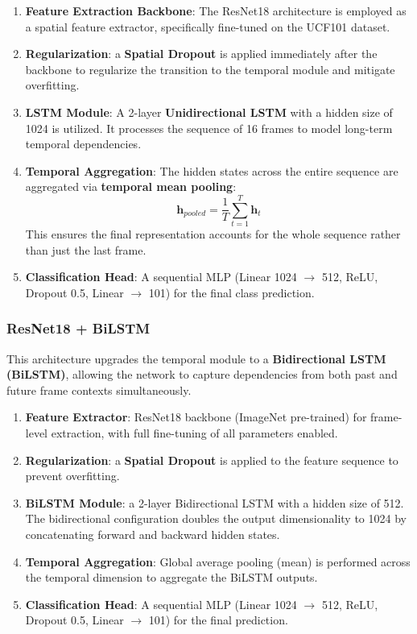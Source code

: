 \begin{enumerate} 
    \item \textbf{Feature Extraction Backbone}: The ResNet18 architecture is employed as a spatial feature extractor, specifically fine-tuned on the UCF101 dataset.
    \item \textbf{Regularization}: a \textbf{Spatial Dropout} is applied immediately after the backbone to regularize the transition to the temporal module and mitigate overfitting.
    \item \textbf{LSTM Module}: A 2-layer \textbf{Unidirectional LSTM} with a hidden size of 1024 is utilized. It processes the sequence of 16 frames to model long-term temporal dependencies.
    \item \textbf{Temporal Aggregation}: The hidden states across the entire sequence are aggregated via \textbf{temporal mean pooling}:
    \[ \mathbf{h}_{pooled} = \frac{1}{T} \sum_{t=1}^{T} \mathbf{h}_t \]
    \noindent
    This ensures the final representation accounts for the whole sequence rather than just the last frame.
    \item \textbf{Classification Head}: A sequential MLP (Linear 1024 $\to$ 512, ReLU, Dropout 0.5, Linear $\to$ 101) for the final class prediction.
\end{enumerate}

\subsubsection{ResNet18 + BiLSTM}

This architecture upgrades the temporal module to a \textbf{Bidirectional LSTM (BiLSTM)}, allowing the network to capture dependencies from both past and future frame contexts simultaneously.

\begin{enumerate} 
    \item \textbf{Feature Extractor}: ResNet18 backbone (ImageNet pre-trained) for frame-level extraction, with full fine-tuning of all parameters enabled.
    \item \textbf{Regularization}: a \textbf{Spatial Dropout} is applied to the feature sequence to prevent overfitting.
    \item \textbf{BiLSTM Module}: a 2-layer Bidirectional LSTM with a hidden size of 512. The bidirectional configuration doubles the output dimensionality to 1024 by concatenating forward and backward hidden states.
    \item \textbf{Temporal Aggregation}: Global average pooling (mean) is performed across the temporal dimension to aggregate the BiLSTM outputs.
    \item \textbf{Classification Head}: A sequential MLP (Linear 1024 $\to$ 512, ReLU, Dropout 0.5, Linear $\to$ 101) for the final prediction.
\end{enumerate}

